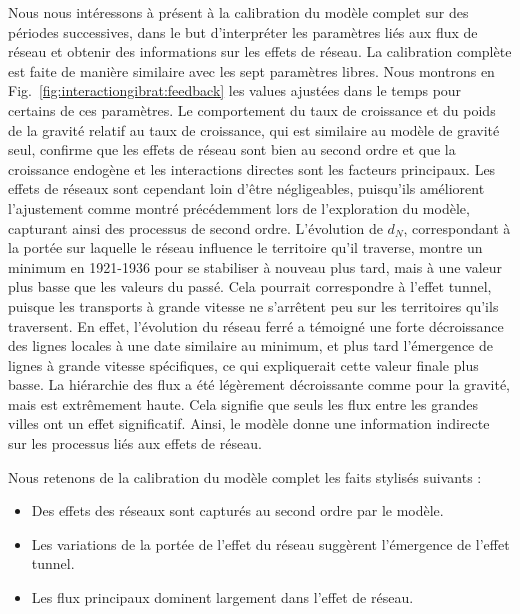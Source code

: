 {Nous nous intéressons à présent à la calibration du modèle complet sur des périodes successives, dans le but d'interpréter les paramètres liés aux flux de réseau et obtenir des informations sur les effets de réseau. La calibration complète est faite de manière similaire avec les sept paramètres libres. Nous montrons en Fig.~\ref{fig:interactiongibrat:feedback} les values ajustées dans le temps pour certains de ces paramètres. Le comportement du taux de croissance et du poids de la gravité relatif au taux de croissance, qui est similaire au modèle de gravité seul, confirme que les effets de réseau sont bien au second ordre et que la croissance endogène et les interactions directes sont les facteurs principaux. Les effets de réseaux sont cependant loin d'être négligeables, puisqu'ils améliorent l'ajustement comme montré précédemment lors de l'exploration du modèle, capturant ainsi des processus de second ordre. L'évolution de $d_N$, correspondant à la portée sur laquelle le réseau influence le territoire qu'il traverse, montre un minimum en 1921-1936 pour se stabiliser à nouveau plus tard, mais à une valeur plus basse que les valeurs du passé. Cela pourrait correspondre à l'effet tunnel, puisque les transports à grande vitesse ne s'arrêtent peu sur les territoires qu'ils traversent. En effet, l'évolution du réseau ferré a témoigné une forte décroissance des lignes locales à une date similaire au minimum, et plus tard l'émergence de lignes à grande vitesse spécifiques, ce qui expliquerait cette valeur finale plus basse. La hiérarchie des flux a été légèrement décroissante comme pour la gravité, mais est extrêmement haute. Cela signifie que seuls les flux entre les grandes villes ont un effet significatif. Ainsi, le modèle donne une information indirecte sur les processus liés aux effets de réseau.
}


Nous retenons de la calibration du modèle complet les faits stylisés suivants :
\begin{itemize}
	\item Des effets des réseaux sont capturés au second ordre par le modèle.
	\item Les variations de la portée de l'effet du réseau suggèrent l'émergence de l'effet tunnel.
	\item Les flux principaux dominent largement dans l'effet de réseau.
\end{itemize}



